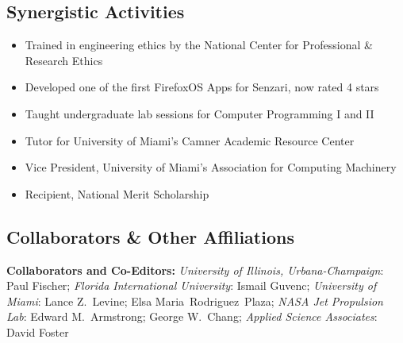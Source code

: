 \documentclass[svgnames,11pt]{article}
\begin{document}
\subsection{Synergistic Activities}

\begin{itemize}[itemsep=0pt]
    \item Trained in engineering ethics by the National Center for Professional \& Research Ethics
    \item Developed one of the first FirefoxOS Apps for Senzari, now rated 4 stars
    \item Taught undergraduate lab sessions for Computer Programming I and II
    \item Tutor for University of Miami's Camner Academic Resource Center
    \item Vice President, University of Miami's Association for Computing Machinery
    \item Recipient, National Merit Scholarship
\end{itemize}

\subsection{Collaborators \& Other Affiliations}

\begin{bibsection}

    \item \textbf{Collaborators and Co-Editors:}
        \emph{University of Illinois, Urbana-Champaign}:
            Paul Fischer;
        \emph{Florida International University}:
            Ismail Guvenc;
        \emph{University of Miami}:
            Lance Z.~Levine;
            Elsa Maria~Rodriguez~Plaza;
        \emph{NASA Jet Propulsion Lab}:
            Edward M.~Armstrong;
            George W.~Chang;
        \emph{Applied Science Associates}:
            David Foster

\end{bibsection}
\end{document}
